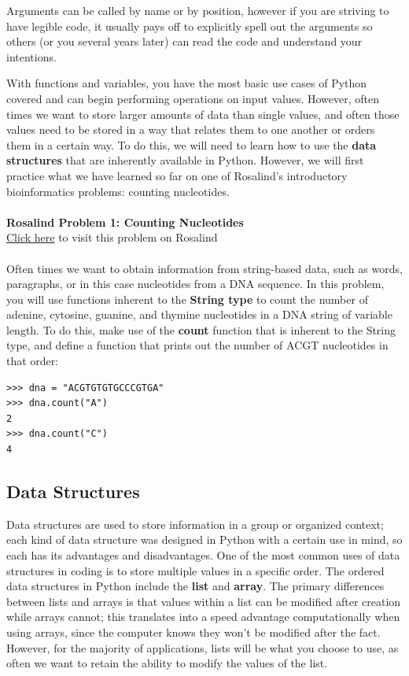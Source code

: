 \documentclass[a4paper,11pt]{article}
\begin{document}
Arguments can be called by name or by position, however if you are striving to have legible code, it 
usually pays off to explicitly spell out the arguments so others (or you several years later) can read 
the code and understand your intentions.  \par
With functions and variables, you have the most basic use cases of Python covered and can begin performing 
operations on input values.  However, often times we want to store larger amounts of data than single values, 
and often those values need to be stored in a way that relates them to one another or orders them in a 
certain way.  To do this, we will need to learn how to use the \textbf{data structures} that are inherently 
available in Python.  However, we will first practice what we have learned so far on one of Rosalind's 
introductory bioinformatics problems: counting nucleotides. \\
\\
\textbf{Rosalind Problem 1: Counting Nucleotides} \\
\href{http://rosalind.info/problems/dna/?class=246}{Click here} to visit this problem on Rosalind \\
\\
Often times we want to obtain information from string-based data, such as words, paragraphs, or in this case 
nucleotides from a DNA sequence.  In this problem, you will use functions inherent to the \textbf{String type} 
to count the number of adenine, cytosine, guanine, and thymine nucleotides in a DNA string of variable length.  
To do this, make use of the \textbf{count} function that is inherent to the String type, and define a function 
that prints out the number of ACGT nucleotides in that order:

\vspace{3mm}
\begin{lstlisting}
>>> dna = "ACGTGTGTGCCCGTGA"
>>> dna.count("A")
2
>>> dna.count("C")
4
\end{lstlisting}
\vspace{3mm}

\pagebreak
\subsection{Data Structures}
Data structures are used to store information in a group or organized context; each kind of data structure was 
designed in Python with a certain use in mind, so each has its advantages and disadvantages.  One of the most 
common uses of data structures in coding is to store multiple values in a specific order.  The ordered data 
structures in Python include the \textbf{list} and \textbf{array}.  The primary differences between lists 
and arrays is that values within a list can be modified after creation while arrays cannot; this translates 
into a speed advantage computationally when using arrays, since the computer knows they won't be modified 
after the fact.  However, for the majority of applications, lists will be what you choose to use, as often 
we want to retain the ability to modify the values of the list. \par
\end{document}
